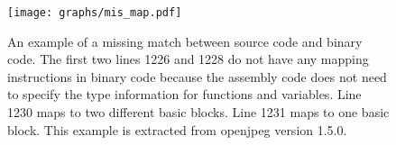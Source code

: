 
\begin{figure}[!t]
\centering
\texttt{[image: graphs/mis\_map.pdf]}
\caption{An example of a missing match between source code and binary code. The first two lines 1226 and 1228 do not have any mapping instructions in binary code because the assembly code does not need to specify the type information for functions and variables. Line 1230 maps to two different basic blocks. Line 1231 maps to one basic block. This example is extracted from openjpeg version 1.5.0.}
\label{fig:missingmap}
\end{figure}



